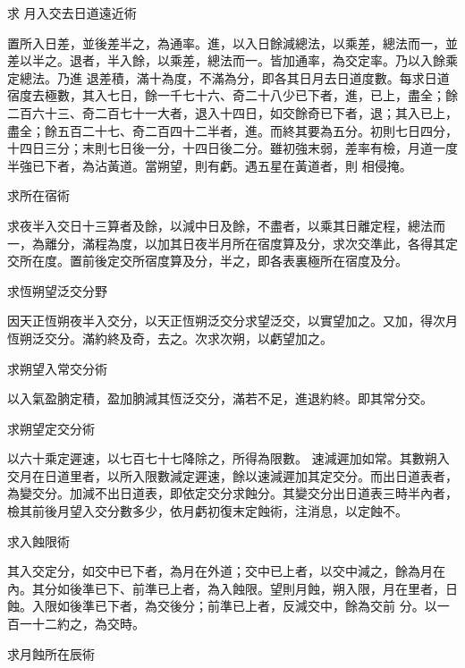 \begin{pinyinscope}
 求
 月入交去日道遠近術



 置所入日差，並後差半之，為通率。進，以入日餘減總法，以乘差，總法而一，並差以半之。退者，半入餘，以乘差，總法而一。皆加通率，為交定率。乃以入餘乘定總法。乃進
 退差積，滿十為度，不滿為分，即各其日月去日道度數。每求日道宿度去極數，其入七日，餘一千七十六、奇二十八少已下者，進，已上，盡全；餘二百六十三、奇二百七十一大者，退入十四日，如交餘奇已下者，退；其入已上，盡全；餘五百二十七、奇二百四十二半者，進。而終其要為五分。初則七日四分，十四日三分；末則七日後一分，十四日後二分。雖初強末弱，差率有檢，月道一度半強已下者，為沾黃道。當朔望，則有虧。遇五星在黃道者，則
 相侵掩。



 求所在宿術



 求夜半入交日十三算者及餘，以減中日及餘，不盡者，以乘其日離定程，總法而一，為離分，滿程為度，以加其日夜半月所在宿度算及分，求次交準此，各得其定交所在度。置前後定交所宿度算及分，半之，即各表裏極所在宿度及分。



 求恆朔望泛交分野



 因天正恆朔夜半入交分，以天正恆朔泛交分求望泛交，以實望加之。又加，得次月恆朔泛交分。滿約終及奇，去之。次求次朔，以虧望加之。



 求朔望入常交分術



 以入氣盈朒定積，盈加朒減其恆泛交分，滿若不足，進退約終。即其常分交。



 求朔望定交分術



 以六十乘定遲速，以七百七十七降除之，所得為限數。
 速減遲加如常。其數朔入交月在日道里者，以所入限數減定遲速，餘以速減遲加其定交分。而出日道表者，為變交分。加減不出日道表，即依定交分求蝕分。其變交分出日道表三時半內者，檢其前後月望入交分數多少，依月虧初復末定蝕術，注消息，以定蝕不。



 求入蝕限術



 其入交定分，如交中已下者，為月在外道；交中已上者，以交中減之，餘為月在內。其分如後準已下、前準已上者，為入蝕限。望則月蝕，朔入限，月在里者，日蝕。入限如後準已下者，為交後分；前準已上者，反減交中，餘為交前
 分。以一百一十二約之，為交時。



 求月蝕所在辰術




\end{pinyinscope}
